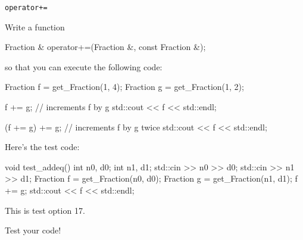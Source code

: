 \verb!operator+=!

Write a function
\begin{console}[commandchars=\\\{\}]
Fraction & operator+=(Fraction &, const Fraction &);
\end{console}
so that you can execute the following code:
\begin{console}
Fraction f = get_Fraction(1, 4);
Fraction g = get_Fraction(1, 2);

f += g; // increments f by g
std::cout << f << std::endl;

(f += g) += g; // increments f by g twice
std::cout << f << std::endl;
\end{console}

Here's the test code:
\begin{console}
void test_addeq()
{
    int n0, d0;
    int n1, d1;
    std::cin >> n0 >> d0;
    std::cin >> n1 >> d1;
    Fraction f = get_Fraction(n0, d0);
    Fraction g = get_Fraction(n1, d1);
    f += g;
    std::cout << f << std::endl;
}
\end{console}
This is test option 17.

Test your code!
